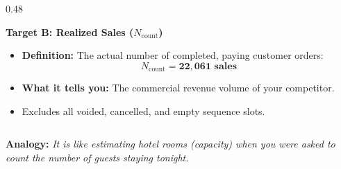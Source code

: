 \documentclass[aspectratio=169,10pt]{beamer}
\begin{document}
\begin{frame}[c]
\begin{columns}[t,onlytextwidth]
\begin{column}{0.48\textwidth}
{\begin{minipage}{\dimexpr\linewidth-2\fboxsep-2\fboxrule\relax}
          {\small \textbf{\color{accentred} Target B: Realized Sales ($N_{\mathrm{count}}$)}}\\[0.08cm]
          {\scriptsize
          \begin{itemize}
            \setlength{\itemsep}{0.08cm}
            \item \textbf{Definition:} The actual number of completed, paying customer orders:
            \begin{equation*}
              N_{\mathrm{count}} = \mathbf{22{,}061 \text{ sales}}
            \end{equation*}
            \item \textbf{What it tells you:} The commercial revenue volume of your competitor.
            \item Excludes all voided, cancelled, and empty sequence slots.
          \end{itemize}}
          \vspace{0.08cm}
        \end{minipage}
      }
    \end{column}
  \end{columns}
  
  \vspace{0.22cm}
  \begin{center}
    \setlength{\fboxrule}{1pt}
  \end{center}
  
  \vspace{0.06cm}
  \begin{center}
    {\footnotesize \textbf{\color{headernavy} Analogy: } \textit{It is like estimating hotel rooms (capacity) when you were asked to count the number of guests staying tonight.}}
  \end{center}
\end{frame}
\end{document}
